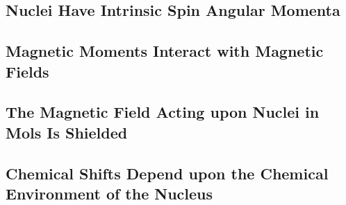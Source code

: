 \documentclass[a4paper]{article}
\numberwithin{equation}{section}
\begin{document}
\subsection{Nuclei Have Intrinsic Spin Angular Momenta}
\subsection{Magnetic Moments Interact with Magnetic Fields}
\subsection{}
\subsection{The Magnetic Field Acting upon Nuclei in Mols Is Shielded}
\subsection{Chemical Shifts Depend upon the Chemical Environment of the Nucleus}
\end{document}
